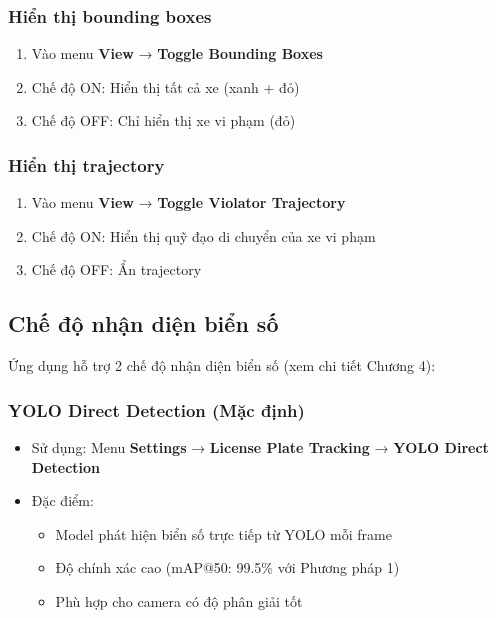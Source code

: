 \subsubsection{Hiển thị bounding boxes}
\begin{enumerate}
    \item Vào menu \textbf{View} → \textbf{Toggle Bounding Boxes}
    \item Chế độ ON: Hiển thị tất cả xe (xanh + đỏ)
    \item Chế độ OFF: Chỉ hiển thị xe vi phạm (đỏ)
\end{enumerate}

\subsubsection{Hiển thị trajectory}
\begin{enumerate}
    \item Vào menu \textbf{View} → \textbf{Toggle Violator Trajectory}
    \item Chế độ ON: Hiển thị quỹ đạo di chuyển của xe vi phạm
    \item Chế độ OFF: Ẩn trajectory
\end{enumerate}

\subsection{Chế độ nhận diện biển số}

Ứng dụng hỗ trợ 2 chế độ nhận diện biển số (xem chi tiết Chương 4):

\subsubsection{YOLO Direct Detection (Mặc định)}
\begin{itemize}
    \item Sử dụng: Menu \textbf{Settings} → \textbf{License Plate Tracking} → \textbf{YOLO Direct Detection}
    \item Đặc điểm:
    \begin{itemize}
        \item Model phát hiện biển số trực tiếp từ YOLO mỗi frame
        \item Độ chính xác cao (mAP@50: 99.5\% với Phương pháp 1)
        \item Phù hợp cho camera có độ phân giải tốt
    \end{itemize}
\end{itemize}

